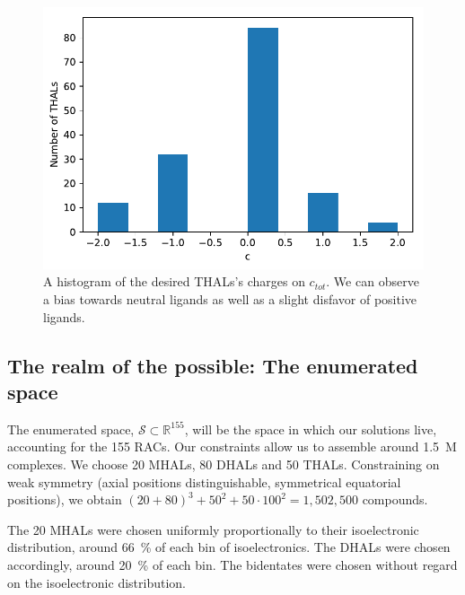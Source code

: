 \begin{figure}[]{}
	\centering	
	\includegraphics[width=.9\linewidth]{img/thal_ss_hist_charge.pdf} 
	\caption{A histogram of the desired THALs's charges on $c_{tot}$. We can observe a bias towards neutral ligands as well as a slight disfavor of positive ligands.} 
	\label{fig:thalhist_charge}
\end{figure}

\subsection{The realm of the possible: The enumerated space}
The enumerated space, $\mathcal{S} \subset \mathbb{R}^{155}$, will be the space in which our solutions live, accounting for the 155 RACs. Our constraints allow us to assemble around 1.5~M complexes. We choose 20 MHALs, 80 DHALs and 50 THALs. Constraining on weak symmetry (axial positions distinguishable, symmetrical equatorial positions), we obtain $(20 + 80)^3 + 50^2 + 50 \cdot 100^2 = 1,502,500$ compounds. 

The 20 MHALs were chosen uniformly proportionally to their isoelectronic distribution, around 66~\% of each bin of isoelectronics. The DHALs were chosen accordingly, around 20~\% of each bin. The bidentates were chosen without regard on the isoelectronic distribution. 